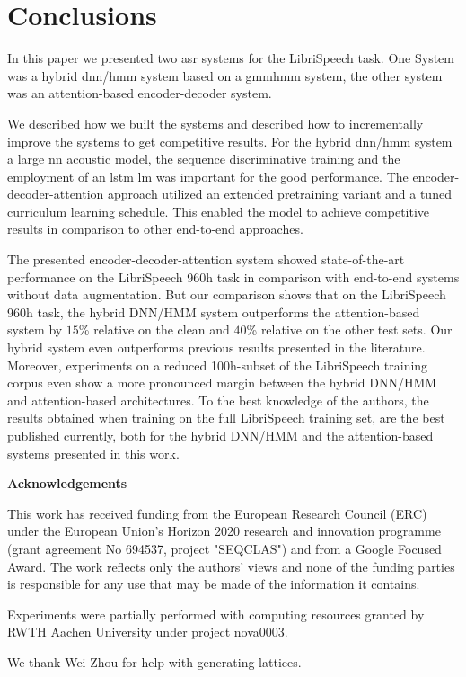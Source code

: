 \documentclass[a4paper]{article}
\def\acknowledgements{\begin{center}
{\bf \large Acknowledgements\vspace{-.5em}\vspace{2pt}}
\end{center}}
\begin{document}
\section{Conclusions}

In this paper we presented two \ac{asr} systems for the LibriSpeech task.
One System was a hybrid \ac{dnn}/\ac{hmm} system based on a \ac{gmmhmm} system, the other system was an attention-based encoder-decoder system.\par
We described how we built the systems and described how to incrementally improve the systems to get competitive results.
For the hybrid \ac{dnn}/\ac{hmm} system a large \ac{nn} acoustic model, the sequence discriminative training and the employment of an \ac{lstm} \ac{lm} was important for the good performance.
The encoder-decoder-attention approach utilized an extended pretraining variant and a tuned curriculum learning schedule.
This enabled the model to achieve competitive results in comparison to other end-to-end approaches.

The presented encoder-decoder-attention system showed state-of-the-art performance on the LibriSpeech 960h task in comparison with end-to-end systems without data augmentation.
But our comparison shows that on the LibriSpeech 960h task, the hybrid DNN/HMM system outperforms the attention-based system by $15$\% relative on the clean and $40$\% relative on the other test sets.
Our hybrid system even outperforms previous results presented in the literature.
Moreover, experiments on a reduced 100h-subset of the LibriSpeech training corpus even show a more pronounced margin between the hybrid DNN/HMM and attention-based architectures.
To the best knowledge of the authors, the results obtained when training on the full LibriSpeech training set, are the best published currently, both for the hybrid DNN/HMM and the attention-based systems presented in this work.

\acknowledgements

\begin{footnotesize}

This work has received funding from the European Research Council (ERC)
under the European Union's Horizon 2020 research and innovation programme
(grant agreement No 694537, project "SEQCLAS")
and from a Google Focused Award.
The work reflects only the authors' views and
none of the funding parties is responsible for any
use that may be made of the information it contains.

Experiments were partially performed with computing resources granted by RWTH Aachen University under project nova0003.

We thank Wei Zhou for help with generating lattices.

\end{footnotesize}




\end{document}
